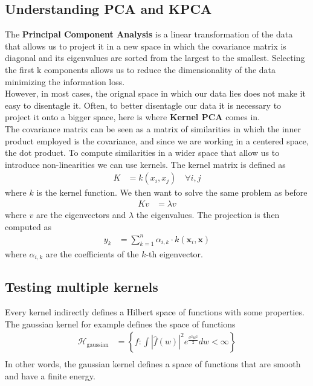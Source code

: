 \subsection{Understanding PCA and KPCA}
The \textbf{Principal Component Analysis} is a linear transformation of the data that allows us to project it in a new space in which the covariance matrix is diagonal and its eigenvalues are sorted from the largest to the smallest. Selecting the first k components allows us to reduce the dimensionality of the data minimizing the information loss. \\
However, in most cases, the orignal space in which our data lies does not make it easy to disentagle it. Often, to better disentagle our data it is necessary to project it onto a bigger space, here is where \textbf{Kernel PCA} comes in. \\
The covariance matrix can be seen as a matrix of similarities in which the inner product employed is the covariance, and since we are working in a centered space, the dot product. To compute similarities in a wider space that allow us to introduce non-linearities we can use kernels.
The kernel matrix is defined as
\begin{align}
    K &= k(x_i, x_j) \quad \forall i, j
\end{align}
where $k$ is the kernel function. We then want to solve the same problem as before
\begin{align}
    K v &= \lambda v
\end{align}
where $v$ are the eigenvectors and $\lambda$ the eigenvalues. The projection is then computed as
\begin{align}
    y_k &= \sum_{k=1}^{n} \alpha_{i,k} \cdot k(\mathbf{x}_i, \mathbf{x})
\end{align}
where $\alpha_{i,k}$ are the coefficients of the $k$-th eigenvector.


\subsection{Testing multiple kernels}
Every kernel indirectly defines a Hilbert space of functions with some
properties. The gaussian kernel for example defines the space of functions
\begin{align*}
    \mathcal{H}_{\text{gaussian}}   &= \left\{ f : \int | \hat{f}(w) |^2 e^{\frac{\sigma^2 w^2}{2}} dw < \infty \right\} \\
\end{align*}
In other words, the gaussian kernel defines a space of functions that are
smooth and have a finite energy. 


